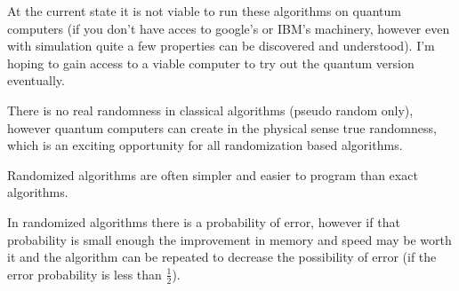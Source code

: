 At the current state it is not viable to run these algorithms on quantum computers (if you don't have acces to google's or IBM's machinery, however even with simulation quite a few properties can be discovered and understood). I'm hoping to gain access to a viable computer to try out the quantum version eventually.

There is no real randomness in classical algorithms (pseudo random only), however quantum computers can create in the physical sense true randomness, which is an exciting opportunity for all randomization based algorithms.

Randomized algorithms are often simpler and easier to program than exact algorithms.

In randomized algorithms there is a probability of error, however if that probability is small enough the improvement in memory and speed may be worth it and the algorithm can be repeated to decrease the possibility of error (if the error probability is less than $\frac{1}{2}$).